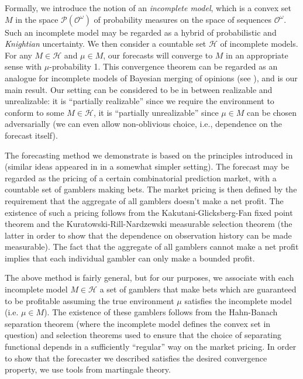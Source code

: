 \documentclass[aop,preprint]{imsart}
\numberwithin{equation}{section}
\theoremstyle{definition}
\theoremstyle{plain}
\newcommand{\PM}{\mathcal{P}}
\newcommand{\Ob}{\mathcal{O}}
\newcommand{\OO}{\Ob^\omega}
\newcommand{\PMO}{\PM(\OO)}
\newcommand{\MC}{\mathcal{H}}
\begin{document}
Formally, we introduce the notion of an \emph{incomplete model}, which is a convex set $M$ in the space $\PMO$ of probability measures on the space of sequences $\OO$. Such an incomplete model may be regarded as a hybrid of probabilistic and \emph{Knightian} uncertainty. We then consider a countable set $\MC$ of incomplete models. For any $M \in \MC$ and $\mu \in M$, our forecasts will converge to $M$ in an appropriate sense with $\mu$-probability 1. This convergence theorem can be regarded as an analogue for incomplete models of Bayesian merging of opinions (see \cite{Blackwell_1962}), and is our main result. Our setting can be considered to be in between realizable and unrealizable: it is \enquote{partially realizable} since we require the environment to conform to some $M \in \MC$, it is \enquote{partially unrealizable} since $\mu \in M$ can be chosen adversarially (we can even allow non-oblivious choice, i.e., dependence on the forecast itself).

The forecasting method we demonstrate is based on the principles introduced in \cite{Garrabrant_2016} (similar ideas appeared in \cite{Vovk_2005} in a somewhat simpler setting). The forecast may be regarded as the pricing of a certain combinatorial prediction market, with a countable set of gamblers making bets. The market pricing is then defined by the requirement that the aggregate of all gamblers doesn't make a net profit. The existence of such a pricing follows from the Kakutani-Glicksberg-Fan fixed point theorem and the Kuratowski-Rill-Nardzewski measurable selection theorem (the latter in order to show that the dependence on observation history can be made measurable). The fact that the aggregate of all gamblers cannot make a net profit implies that each individual gambler can only make a bounded profit.

The above method is fairly general, but for our purposes, we associate with each incomplete model $M \in \MC$ a set of gamblers that make bets which are guaranteed to be profitable assuming the true environment $\mu$ satisfies the incomplete model (i.e. $\mu \in M$). The existence of these gamblers follows from the Hahn-Banach separation theorem (where the incomplete model defines the convex set in question) and selection theorems used to ensure that the choice of separating functional depends in a sufficiently \enquote{regular} way on the market pricing. In order to show that the forecaster we described satisfies the desired convergence property, we use tools from martingale theory.
\end{document}
